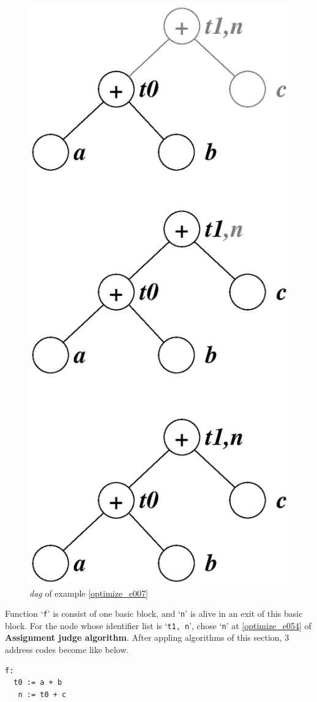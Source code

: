 \begin{Example}
\begin{figure}[htbp]
\begin{center}
\begin{latexonly}
\includegraphics[width=0.468\linewidth,height=1.0\linewidth]{opt001.eps}
\end{latexonly}
\caption{{\em dag} of example \ref{optimize_e007}}
\label{optimize_e008}
\end{center}
\end{figure}
Function `{\tt{f}}' is consist of one basic block, and 
`{\tt{n}}' is alive in an exit of this basic block.
For the node whose identifier list is `{\tt{t1, n}}',
chose `{\tt{n}}' at \ref{optimize_e054} of {\bf Assignment judge algorithm}.
After appling algorithms of this section,
3 address codes become like below.
\begin{verbatim}
f:
  t0 := a + b
   n := t0 + c
\end{verbatim}
\end{Example}

